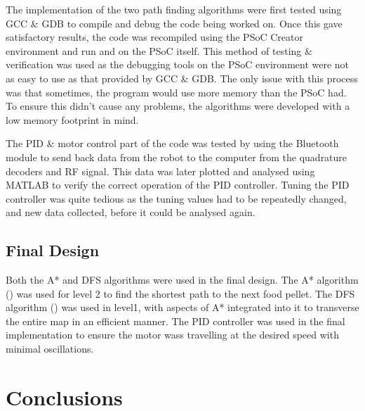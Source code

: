 \documentclass{article}
\begin{document}
The implementation of the two path finding algorithms were first tested using GCC \& GDB to compile and debug the code being worked on. Once this gave satisfactory results, the code was recompiled using the PSoC Creator environment and run and on the PSoC itself. This method of testing \& verification was used as the debugging tools on the PSoC environment were not as easy to use as that provided by GCC \& GDB. The only issue with this process was that sometimes, the program would use more memory than the PSoC had. To ensure this didn't cause any problems, the algorithms were developed with a low memory footprint in mind.

The PID \& motor control part of the code was tested by using the Bluetooth module to send back data from the robot to the computer from the quadrature decoders and RF signal. This data was later plotted and analysed using MATLAB to verify the correct operation of the PID controller. Tuning the PID controller was quite tedious as the tuning values had to be repeatedly changed, and new data collected, before it could be analysed again.

\subsection{Final Design}

Both the A* and DFS algorithms were used in the final design. The A* algorithm () was used for level 2 to find the shortest path to the next food pellet. The DFS algorithm () was used in level1, with aspects of A* integrated into it to transverse the entire map in an efficient manner. The PID controller was used in the final implementation to ensure the motor wass travelling at the desired speed with minimal oscillations.


\section{Conclusions}
\end{document}
